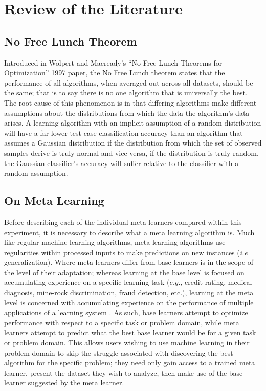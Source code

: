 \chapter{Review of the Literature}
\label{Chapter2}
\section{No Free Lunch Theorem}
Introduced in Wolpert and Macready's ``No Free Lunch Theorems for Optimization''
1997 paper, the No Free Lunch theorem states that the performance of all
algorithms, when averaged out across all datasets, should be the same; that is
to say there is no one algorithm that is universally the best. The root cause of
this phenomenon is in that differing algorithms make different assumptions
about the distributions from which the data the algorithm's data arises. A
learning algorithm with an implicit assumption of a random distribution will
have a far lower test case classification accuracy than an algorithm that
assumes a Gaussian distribution if the distribution from which the set of
observed samples derive is truly normal and vice versa, if the
distribution is truly random, the Gaussian classifier's accuracy will suffer
relative to the classifier with a random assumption.
\section{On Meta Learning}
Before describing each of the individual meta learners compared within this
experiment, it is necessary to describe what a meta learning algorithm is.
Much like regular machine learning algorithms, meta learning algorithms use regularities
within processed inputs to make predictions on new instances (\textit{i.e} generalization).
Where meta learners differ from base learners is in the scope of the level of their adaptation; whereas
learning at the base level is focused on accumulating experience on a specific
learning task ($e.g.$, credit rating, medical diagnosis, mine-rock discrimination,
fraud detection, etc.), learning at the meta level is concerned with accumulating
experience on the performance of multiple applications of a learning system
\cite{Vilalta}. As such, base learners attempt to optimize performance with
respect to a specific task or problem domain, while meta learners attempt to
predict what the best base learner would be for a given task or problem domain.
This allows users wishing to use machine learning in their problem domain to skip
the struggle associated with discovering the best algorithm for the specific
problem; they need only gain access to a trained meta learner, present the dataset
they wish to analyze, then make use of the base learner suggested by the meta
learner.

